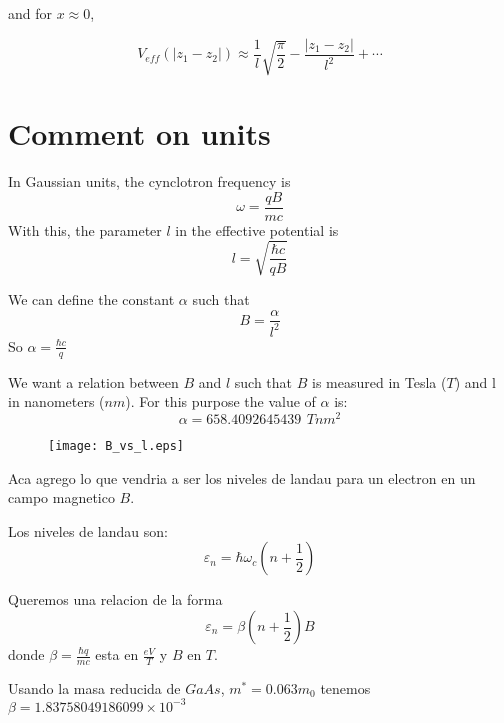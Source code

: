 \documentclass[a4paper,10pt]{article}
\begin{document}
\noindent and for $x\approx 0$,

\begin{equation}
V_{eff}(|z_1-z_2|)\approx \frac{1}{l}\sqrt{\frac{\pi}{2}} - \frac{|z_1-z_2|}{l^2}+ \cdots
\end{equation}

\section*{Comment on units}

In Gaussian units, the cynclotron frequency is
\begin{equation}
\omega = \frac{qB}{mc}
\end{equation}
\noindent
With this, the parameter $l$ in the effective potential is
\begin{equation}
l = \sqrt{\frac{\hbar c}{q B}}
\end{equation}

We can define the constant $\alpha$ such that
\begin{equation}
B = \frac{\alpha}{l^2}
\end{equation}
\noindent
So $\alpha = \frac{\hbar c}{q}$

We want a relation between $B$ and $l$ such that $B$ is measured in Tesla ($T$) and
l in nanometers ($nm$). For this purpose the value of $\alpha$ is:
\begin{equation}
\alpha = 658.4092645439 \, \ T nm^2
\end{equation}

\begin{figure}[ht]
\begin{center}
 \texttt{[image: B\_vs\_l.eps]}
\end{center}
\end{figure}

Aca agrego lo que vendria a ser los niveles de landau para un electron en un campo magnetico $B$.

Los niveles de landau son:
\begin{equation}
\varepsilon_n = \hbar \omega_c \left(n + \frac{1}{2}\right)
\end{equation}

Queremos una relacion de la forma
\begin{equation}
\varepsilon_n = \beta \left(n+\frac{1}{2}\right) B
\end{equation}
\noindent
donde $\beta = \frac{\hbar q}{m c}$ esta en $\frac{eV}{T}$ y $B$ en $T$.

Usando la masa reducida de $GaAs$, $m^* = 0.063 m_0$ tenemos $\beta = 1.83758049186099\times 10^{-3}$
\end{document}
